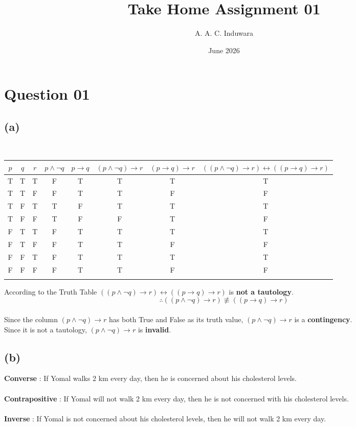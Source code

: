 \documentclass[a4paper,12pt]{article}
\title{Take Home Assignment 01}
\author{A. A. C. Induwara}
\date{June 2026}
\begin{document}
\maketitle
\newpage
\tableofcontents
\newpage
{}
\setcounter{secnumdepth}{0}

\section{Question 01}
\subsection{(a)}
\,
\begin{tabular}{ccc|c|c|c|c|c}
    $p$ & $q$ & $r$ & $p \land \neg q$ & $p \rightarrow q$ & $(p \land \neg q) \rightarrow r$ & $(p \rightarrow q) \rightarrow r$ & $((p \land \neg q) \rightarrow r )\leftrightarrow ((p \rightarrow q) \rightarrow r)$\\
    \hline
    T & T & T & F & T & T & T & T\\
    T & T & F & F & T & T & F & F\\
    T & F & T & T & F & T & T & T\\
    T & F & F & T & F & F & T & F\\
    F & T & T & F & T & T & T & T\\
    F & T & F & F & T & T & F & F\\
    F & F & T & F & T & T & T & T\\
    F & F & F & F & T & T & F & F\\\\
\end{tabular}
According to the Truth Table $((p \land \neg q) \rightarrow r )\leftrightarrow ((p \rightarrow q) \rightarrow r)$ is \textbf{not a tautology}.\\
$$\therefore ((p \land \neg q) \rightarrow r ) \not\equiv ((p \rightarrow q) \rightarrow r)$$\\
Since the column $(p \land \neg q) \rightarrow r$ has both True and False as its truth value, $(p \land \neg q) \rightarrow r$ is a \textbf{contingency}.\\ 
Since it is not a tautology, $(p \land \neg q) \rightarrow r$ is \textbf{invalid}.

\subsection{(b)}

\textbf{Converse} : If Yomal walks 2 km every day, then he is concerned about his cholesterol levels.\\\\
\textbf{Contrapositive} : If Yomal will not walk 2 km every day, then he is not concerned with his cholesterol levels.\\\\
\textbf{Inverse} : If Yomal is not concerned about his cholesterol levels, then he will not walk 2 km every day.\\
\end{document}
